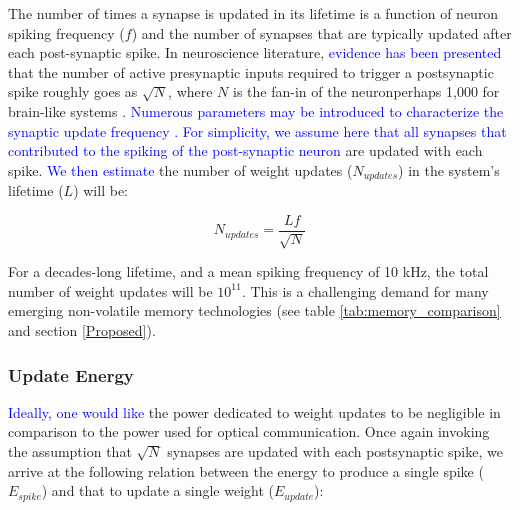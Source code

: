 \documentclass[twocolumn]{article}
\begin{document}
The number of times a synapse is updated in its lifetime is a function of neuron spiking frequency ($f$) and the number of synapses that are typically updated after each post-synaptic spike. In neuroscience literature, \textcolor{blue}{evidence has been presented} that the number of active presynaptic inputs required to trigger a postsynaptic spike roughly goes as $\sqrt{N}$, where $N$ is the fan-in of the neuron\textemdash perhaps 1,000 for brain-like systems \cite{vrso1996,vora2005}. \textcolor{blue}{Numerous parameters may be introduced to characterize the synaptic update frequency \cite{fuab2007}. For simplicity, we assume here that all synapses that contributed to the spiking of the post-synaptic neuron} are updated with each spike. \textcolor{blue}{We then estimate} the number of weight updates ($N_{updates}$) in the system's lifetime ($L$) will be:

\begin{equation}
    N_{updates} = \frac{Lf}{\sqrt{N}}
\end{equation}

For a decades-long lifetime, and a mean spiking frequency of 10 kHz, the total number of weight updates will be $10^{11}$. This is a challenging demand for many emerging non-volatile memory technologies (see table \ref{tab:memory_comparison} and section \ref{Proposed}).

\subsubsection{Update Energy}
\textcolor{blue}{Ideally, one would like} the power dedicated to weight updates to be negligible in comparison to the power used for optical communication. Once again invoking the assumption that $\sqrt{N}$ synapses are updated with each postsynaptic spike, we arrive at the following relation between the energy to produce a single spike ($E_{spike}$) and that to update a single weight ($E_{update}$):
\end{document}
